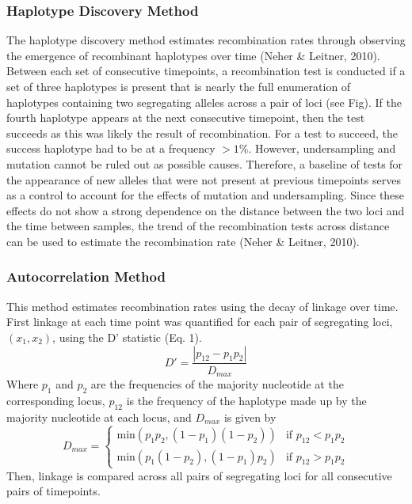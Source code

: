 \documentclass[12pt]{article}
\begin{document}
\subsubsection*{Haplotype Discovery Method}
The haplotype discovery method estimates recombination rates through observing the emergence of recombinant haplotypes over time (Neher \& Leitner, 2010). Between each set of consecutive timepoints, a recombination test is conducted if a set of three haplotypes is present that is nearly the full enumeration of haplotypes containing two segregating alleles across a pair of loci (see Fig). If the fourth haplotype appears at the next consecutive timepoint, then the test succeeds as this was likely the result of recombination. For a test to succeed, the success haplotype had to be at a frequency $>1\%$.  However, undersampling and mutation cannot be ruled out as possible causes. Therefore, a baseline of tests for the appearance of new alleles that were not present at previous timepoints serves as a control to account for the effects of mutation and undersampling. Since these effects do not show a strong dependence on the distance between the two loci and the time between samples, the trend of the recombination tests across distance can be used to estimate the recombination rate (Neher \& Leitner, 2010).
\newpage
\subsubsection*{Autocorrelation Method}

    This method estimates recombination rates using the decay of linkage over time. First linkage at each time point was quantified for each pair of segregating loci, $(x_1, x_2)$, using the D’ statistic (Eq. 1). 
 \begin{equation}
 D' = \frac{|p_{12} - p_1p_2|}{D_{max}}
 \end{equation}
     Where $p_1$ and $p_2$ are the frequencies of the majority nucleotide at the corresponding locus, $p_{12}$ is the frequency of the haplotype made up by the majority nucleotide at each locus, and $D_{max}$ is given by
\[
    D_{max} = \begin{cases}
    \text{min}(p_1p_2, (1-p_1)(1-p_2)) & \text{if }p_{12} < p_1p_2\\
    \text{min}(p_1(1-p_2), (1-p_1)p_2) & \text{if }p_{12} > p_1p_2
    \end{cases}
\]
Then, linkage is compared across all pairs of segregating loci for all consecutive pairs of timepoints.\\
\end{document}
